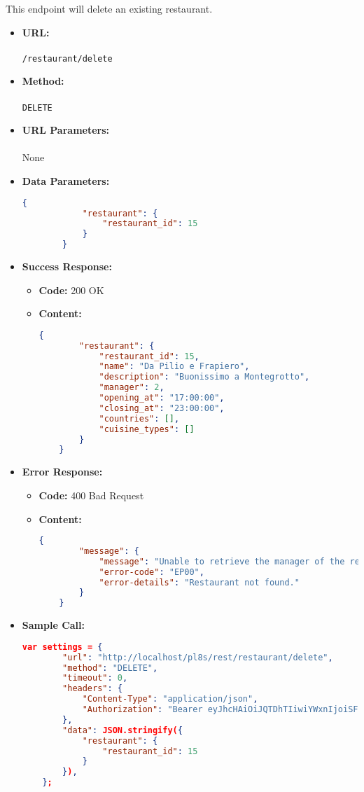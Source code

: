 

This endpoint will delete an existing restaurant.

\begin{itemize}
    \item \textbf{URL:} \\\\\texttt{/restaurant/delete}
    \item \textbf{Method:} \\\\\texttt{DELETE}
    \item \textbf{URL Parameters:} \\\\None
    \item \textbf{Data Parameters:}
	\begin{lstlisting}[language=json]
		{
			"restaurant": {
				"restaurant_id": 15
			}
		}
	\end{lstlisting}
    \item \textbf{Success Response:}
		\begin{itemize}
			\item[$\circ$] \textbf{Code:} 200 OK
			\item[] \textbf{Content:}
			\begin{lstlisting}[language=json]
	{
		"restaurant": {
			"restaurant_id": 15,
			"name": "Da Pilio e Frapiero",
			"description": "Buonissimo a Montegrotto",
			"manager": 2,
			"opening_at": "17:00:00",
			"closing_at": "23:00:00",
			"countries": [],
			"cuisine_types": []
		}
	}
			\end{lstlisting}
		\end{itemize}
	
    \item \textbf{Error Response:}
    	\begin{itemize}
			\item[$\circ$] \textbf{Code:} 400 Bad Request
			\item[] \textbf{Content:}
			\begin{lstlisting}[language=json]
	{
		"message": {
			"message": "Unable to retrieve the manager of the restaurant.",
			"error-code": "EP00",
			"error-details": "Restaurant not found."
		}
	}
			\end{lstlisting}
		\end{itemize}
    \item \textbf{Sample Call:}
		\medskip
		\begin{lstlisting}[language=json]
	var settings = {
	    "url": "http://localhost/pl8s/rest/restaurant/delete",
	    "method": "DELETE",
	    "timeout": 0,
	    "headers": {
	        "Content-Type": "application/json",
	        "Authorization": "Bearer eyJhcHAiOiJQTDhTIiwiYWxnIjoiSFM1MTIifQ.eyJ1aWQiOjIsInJvbCI6Im1hbmFnZXIiLCJ zdHIiOiJjdXNfUHc4cUNVWTg4V2gyMG4iLCJkYXQiOjE3MTQyNTgzOTA0MzV9.VB8_-34BvEUc sM6gVZl0C7q8W3SX767BErL9Nx_1rKluRrwkxi8Oy_9loyRLah6faQaO2hsQa3uxNBDpZYUjBQ"
	    },
	    "data": JSON.stringify({
	        "restaurant": {
	            "restaurant_id": 15
	        }
	    }),
	};


\end{lstlisting}
\end{itemize}
